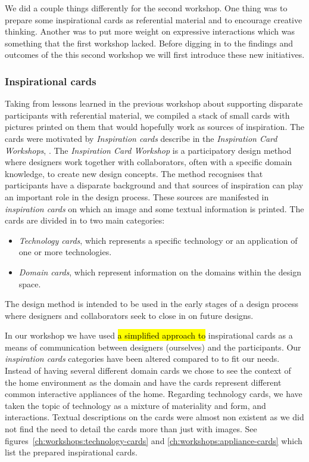 We did a couple things differently for the second workshop.
One thing was to prepare some inspirational cards as referential material and to encourage creative thinking.
Another was to put more weight on expressive interactions which was something that the first workshop lacked.
Before digging in to the findings and outcomes of the this second workshop we will first introduce these new initiatives.

\subsubsection{Inspirational cards}
\label{ch:workshops:workshop-ii:inspiration-cards}
Taking from lessons learned in the previous workshop about supporting disparate participants with referential material, we compiled a stack of small cards with pictures printed on them that would hopefully work as sources of inspiration.
The cards were motivated by \emph{Inspiration cards} describe in the \emph{Inspiration Card Workshops}, \citep{halskov2006inspiration}.
The \emph{Inspiration Card Workshop} is a participatory design method where designers work together with collaborators, often with a specific domain knowledge, to create new design concepts.
The method recognises that participants have a disparate background and that sources of inspiration can play an important role in the design process.
These sources are manifested in \emph{inspiration cards} on which an image and some textual information is printed.
The cards are divided in to two main categories:
\begin{itemize}
  \item{\emph{Technology cards}, which represents a specific technology or an application of one or more technologies.}
  \item{\emph{Domain cards}, which represent information on the domains within the design space.}
\end{itemize}
The design method is intended to be used in the early stages of a design process where designers and collaborators seek to close in on future designs.

In our workshop we have used \hl{a simplified approach to} inspirational cards as a means of communication between designers (ourselves) and the participants.
Our \emph{inspiration cards} categories have been altered compared to \citep{halskov2006inspiration} to fit our needs.
Instead of having several different domain cards we chose to see the context of the home environment as the domain and have the cards represent different common interactive appliances of the home.
Regarding technology cards, we have taken the topic of technology as a mixture of materiality and form, and interactions.
Textual descriptions on the cards were almost non existent as we did not find the need to detail the cards more than just with images.
See figures~\ref{ch:workshops:technology-cards} and \ref{ch:workshops:appliance-cards} which list the prepared inspirational cards.

